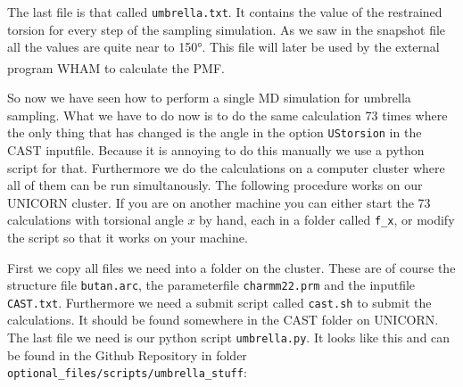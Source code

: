 \documentclass[a4paper,11pt]{scrartcl}
\newcommand{\myCite}[1]{\textsuperscript{\cite{#1}}}
\begin{document}
The last file is that called \texttt{umbrella.txt}. It contains the value of the restrained torsion for every step of the sampling simulation. As we saw in the snapshot file all the values are quite near to 150°. This file will later be used by the external program WHAM\myCite{grossfield_wham_nodate} to calculate the PMF.

\FloatBarrier

So now we have seen how to perform a single MD simulation for umbrella sampling. What we have to do now is to do the same calculation 73 times where the only thing that has changed is the angle in the option \texttt{UStorsion} in the CAST inputfile. Because it is annoying to do this manually we use a python script for that. Furthermore we do the calculations on a computer cluster where all of them can be run simultanously. The following procedure works on our UNICORN cluster. If you are on another machine you can either start the 73 calculations with torsional angle $x$ by hand, each in a folder called \texttt{f\_x}, or modify the script so that it works on your machine.

First we copy all files we need into a folder on the cluster. These are of course the structure file \texttt{butan.arc}, the parameterfile \texttt{charmm22.prm} and the inputfile \texttt{CAST.txt}. Furthermore we need a submit script called \texttt{cast.sh} to submit the calculations. It should be found somewhere in the CAST folder on UNICORN. The last file we need is our python script \texttt{umbrella.py}. It looks like this and can be found in the Github Repository in folder \mbox{\texttt{optional\_files/scripts/umbrella\_stuff}}:
\end{document}
